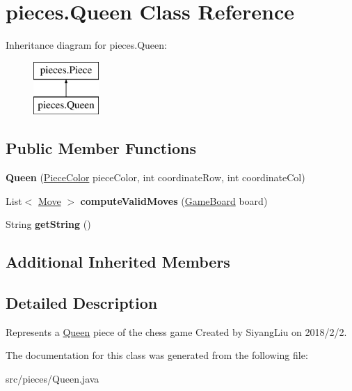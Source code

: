 \hypertarget{classpieces_1_1_queen}{}\section{pieces.\+Queen Class Reference}
\label{classpieces_1_1_queen}
Inheritance diagram for pieces.\+Queen\+:\begin{figure}[H]
\begin{center}
\leavevmode
\includegraphics[height=2.000000cm]{classpieces_1_1_queen}
\end{center}
\end{figure}
\subsection*{Public Member Functions}
\begin{DoxyCompactItemize}
\item 
\mbox{\label{classpieces_1_1_queen_a94fac9d3eb7ef6ef47a0cbbe236ccc69}} 
{\bfseries Queen} (\mbox{\hyperlink{enumpieces_1_1_piece_1_1_piece_color}{Piece\+Color}} piece\+Color, int coordinate\+Row, int coordinate\+Col)
\item 
\mbox{\label{classpieces_1_1_queen_a915eee4d0da44bc2a43b28ba4a971eec}} 
List$<$ \mbox{\hyperlink{classpieces_1_1_move}{Move}} $>$ {\bfseries compute\+Valid\+Moves} (\mbox{\hyperlink{classgameboard_1_1_game_board}{Game\+Board}} board)
\item 
\mbox{\label{classpieces_1_1_queen_a75e77de99a0da6a3422f918da86e4de4}} 
String {\bfseries get\+String} ()
\end{DoxyCompactItemize}
\subsection*{Additional Inherited Members}


\subsection{Detailed Description}
Represents a \mbox{\hyperlink{classpieces_1_1_queen}{Queen}} piece of the chess game Created by Siyang\+Liu on 2018/2/2. 

The documentation for this class was generated from the following file\+:\begin{DoxyCompactItemize}
\item 
src/pieces/Queen.\+java\end{DoxyCompactItemize}
